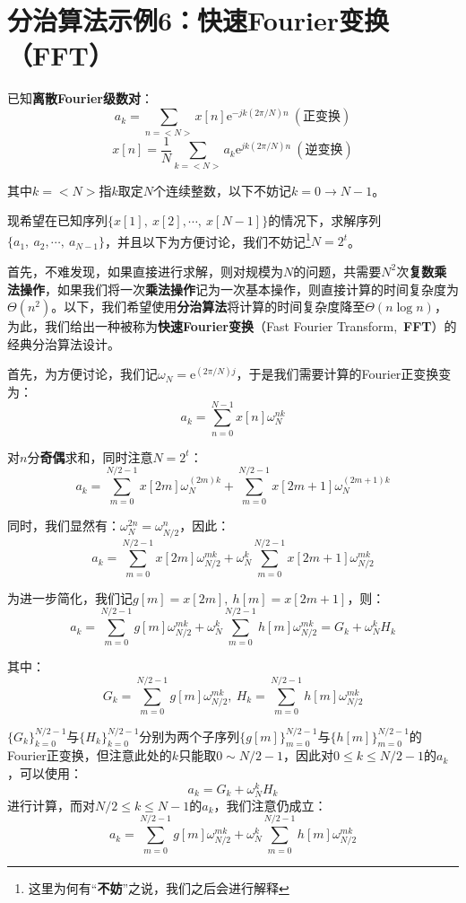 \documentclass[12pt,a4paper,violet,oneside]{bbe}
\begin{document}
\section{分治算法示例6：快速Fourier变换（FFT）}
\begin{example}
	已知\textbf{离散Fourier级数对}：
	$$
	a_k=\sum\limits_{n=<N>}x[n]\mathrm{e}^{-jk(2\pi/N)n}~(\text{正变换})
	$$
	$$
	x[n]=\frac{1}{N}\sum\limits_{k=<N>}a_k\mathrm{e}^{jk(2\pi/N)n}~(\text{逆变换})
	$$
	
	其中$k=<N>$指$k$取定$N$个连续整数，以下不妨记$k=0\to N-1$。
	
	现希望在已知序列$\{x[1],~x[2],\cdots,~x[N-1]\}$的情况下，求解序列$\{a_1,~a_2,\cdots,~a_{N-1}\}$，并且以下为方便讨论，我们不妨记\footnote{这里为何有“\textbf{不妨}”之说，我们之后会进行解释}$N=2^t$。
\end{example}

首先，不难发现，如果直接进行求解，则对规模为$N$的问题，共需要$N^2$次\textbf{复数乘法操作}，如果我们将一次\textbf{乘法操作}记为一次基本操作，则直接计算的时间复杂度为$\Theta(n^2)$。以下，我们希望使用\textbf{分治算法}将计算的时间复杂度降至$\Theta(n\log n)$，为此，我们给出一种被称为\textbf{快速Fourier变换}（Fast Fourier Transform,~\textbf{FFT}）的经典分治算法设计。

首先，为方便讨论，我们记$\omega_N=\mathrm{e}^{(2\pi/N)j}$，于是我们需要计算的Fourier正变换变为：
$$
a_k=\sum\limits_{n=0}^{N-1}x[n]\omega_N^{nk}
$$

对$n$分\textbf{奇偶}求和，同时注意$N=2^t$：
$$
a_k=\sum\limits_{m=0}^{N/2-1}x[2m]\omega_N^{(2m)k}+\sum\limits_{m=0}^{N/2-1}x[2m+1]\omega_N^{(2m+1)k}
$$

同时，我们显然有：$\omega_N^{2n}=\omega_{N/2}^{n}$，因此：
$$
a_k=\sum\limits_{m=0}^{N/2-1}x[2m]\omega_{N/2}^{mk}+\omega_N^{k}\sum\limits_{m=0}^{N/2-1}x[2m+1]\omega_{N/2}^{mk}
$$

为进一步简化，我们记$g[m]=x[2m],~h[m]=x[2m+1]$，则：
$$
a_k=\sum\limits_{m=0}^{N/2-1}g[m]\omega_{N/2}^{mk}+\omega_N^{k}\sum\limits_{m=0}^{N/2-1}h[m]\omega_{N/2}^{mk}=G_k+\omega_N^{k}H_k
$$

其中：
$$
G_k=\sum\limits_{m=0}^{N/2-1}g[m]\omega_{N/2}^{mk},~H_k=\sum\limits_{m=0}^{N/2-1}h[m]\omega_{N/2}^{mk}
$$

$\{G_k\}_{k=0}^{N/2-1}$与$\{H_k\}_{k=0}^{N/2-1}$分别为两个子序列$\{g[m]\}_{m=0}^{N/2-1}$与$\{h[m]\}_{m=0}^{N/2-1}$的Fourier正变换，但注意此处的$k$只能取$0\sim N/2-1$，因此对$0\leqslant k\leqslant N/2-1$的$a_k$，可以使用：
$$
a_k=G_k+\omega_N^{k}H_k
$$
进行计算，而对$N/2\leqslant k\leqslant N-1$的$a_k$，我们注意仍成立：
$$
a_k=\sum\limits_{m=0}^{N/2-1}g[m]\omega_{N/2}^{mk}+\omega_N^{k}\sum\limits_{m=0}^{N/2-1}h[m]\omega_{N/2}^{mk}
$$
\end{document}
